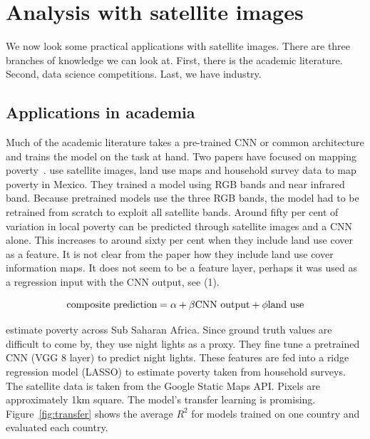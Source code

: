 \documentclass[12pt, a4paper, oneside, headinclude, footinclude]{article}
\begin{document}
\section{Analysis with satellite images}

We now look some practical applications with satellite images. There are three
branches of knowledge we can look at. First, there is the academic literature.
Second, data science competitions. Last, we have industry.

\subsection{Applications in academia}

Much of the academic literature takes a pre-trained CNN or common
architecture and trains the model on the task at hand. Two papers have focused
on mapping poverty~\cite{babenko2017poverty,Jean79}. \cite{babenko2017poverty}
use satellite images, land use maps and household survey data to map
poverty in Mexico.  They trained a model using RGB bands and near infrared
band.  Because pretrained models use the three RGB bands, the model had to be
retrained from scratch to exploit all satellite bands.  Around fifty per cent
of variation in local poverty can be predicted through satellite images and a
CNN alone. This increases to around sixty per cent when they include land use
cover as a feature. It is not clear from the paper how they include land use
cover information maps. It does not seem to be a feature layer, perhaps it was
used as a regression input with the CNN output, see (1).

\begin{equation}
\textup{composite prediction} = \alpha + \beta\textup{CNN output} + \phi\textup{land use}
\end{equation}

\cite{Jean79} estimate poverty across Sub Saharan Africa. Since ground truth
values are difficult to come by, they use night lights as a proxy. They fine
tune a pretrained CNN (VGG 8 layer) to predict night lights. These
features are fed into a ridge regression model (LASSO) to estimate poverty
taken from household surveys. The satellite data is taken from the Google
Static Maps API. Pixels are approximately 1km square. The model's transfer
learning is promising. Figure~\ref{fig:transfer} shows the average $R^2$ for
models trained on one country and evaluated each country.
\end{document}
